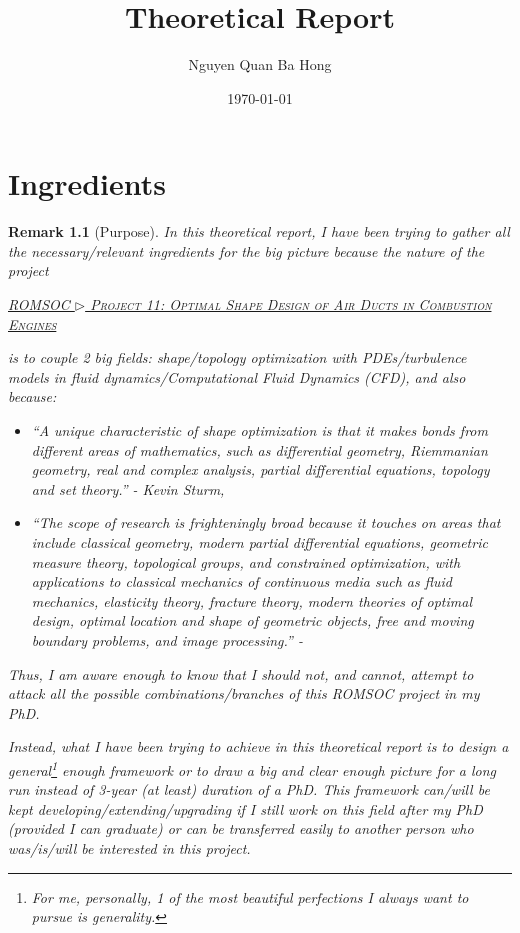 \documentclass{book}
\title{Theoretical Report}
\author{Nguyen Quan Ba Hong}
\date{\today}
\numberwithin{equation}{section}
\newtheorem{remark}{Remark}[section]
\begin{document}
\maketitle
\setcounter{secnumdepth}{6}
\setcounter{tocdepth}{6}
\tableofcontents


\chapter{Ingredients}

\begin{remark}[Purpose]
    In this theoretical report, I have been trying to gather all the necessary/relevant ingredients for the big picture because the nature of the project
    \begin{tcolorbox}
        \href{https://www.romsoc.eu/optimal-shape-design-of-air-ducts-in-combustion-engines/}{\textsc{ROMSOC $\triangleright$ Project 11: Optimal Shape Design of Air Ducts in Combustion Engines}}
    \end{tcolorbox}
    is to couple 2 big fields: shape/topology optimization with PDEs/turbulence models in fluid dynamics/Computational Fluid Dynamics (CFD), and also because:
    \begin{itemize}
        \item ``\emph{A unique characteristic of shape optimization is that it makes bonds from different areas of mathematics, such as differential geometry, Riemmanian geometry, real and complex analysis, partial differential equations, topology and set theory}.'' - Kevin Sturm, \cite{Sturm2015}
        \item ``\emph{The scope of research is frighteningly broad because it touches on areas that include classical geometry, modern partial differential equations, geometric measure theory, topological groups, and constrained optimization, with applications to classical mechanics of continuous media such as fluid mechanics, elasticity theory, fracture theory, modern theories of optimal design, optimal location and shape of geometric objects, free and moving boundary problems, and image processing.}'' - \cite{Delfour_Zolesio2011}
    \end{itemize}
    Thus, I am aware enough to know that I should  not, and cannot, attempt to attack all the possible combinations/branches of this ROMSOC project in my PhD.
    
    Instead, what I have been trying to achieve in this theoretical report is to design a general\footnote{For me, personally, 1 of the most beautiful perfections I always want to pursue is generality.} enough framework or to draw a big and clear enough picture for a long run instead of 3-year (at least) duration of a PhD. This framework can/will be kept developing/extending/upgrading if I still work on this field after my PhD (provided I can graduate) or can be transferred easily to another person who was/is/will be interested in this project.
\end{remark}
\end{document}
